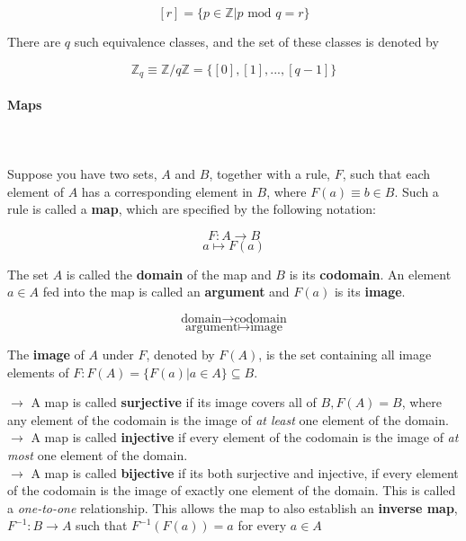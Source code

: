 \documentclass[11pt, oneside]{article}   	%
\begin{document}
\[ [r] = \{ p \in \mathbb{Z} | p \text{ mod } q = r\} \]

There are $q$ such equivalence classes, and the set of these classes is denoted by 

\[ \mathbb{Z}_q \equiv \mathbb{Z} / q\mathbb{Z} = \{[0], [1], ..., [q-1]\} \]

\paragraph{Maps} \mbox{} \\ \\ 

Suppose you have two sets, $A$ and $B$, together with a rule, $F$, such that each element of $A$ has a corresponding element in $B$, where $F(a) \equiv b \in B$. Such a rule is called a \textbf{map}, which are specified by the following notation: 

\[ F: A \rightarrow B \]
\[ a \mapsto F(a) \] 

The set $A$ is called the \textbf{domain} of the map and $B$ is its \textbf{codomain}. An element $a \in A$ fed into the map is called an \textbf{argument} and $F(a)$ is its \textbf{image}. 

\[ \text{domain} \rightarrow \text{codomain} \]
\[ \text{argument} \mapsto \text{image} \]

The \textbf{image} of $A$ under $F$, denoted by $F(A)$, is the set containing
all image elements of $F: F(A) = \{ F(a) | a \in A\} \subseteq B$. \\

\begin{tcolorbox}[colback = blue!5!white, colframe = blue!50!black, title
  = Different Tives] 
  
$\rightarrow$ A map is called \textbf{surjective} if its image covers all of $B, F(A) = B$, where any element of the codomain is the image of \textit{at least} one element of the domain.  \\
\indent $\rightarrow$ A map is called \textbf{injective} if every element of the codomain is the image of \textit{at most} one element of the domain. \\
\indent $\rightarrow$ A map is called \textbf{bijective} if its both surjective
and injective, if every element of the codomain is the image of exactly one
element of the domain. This is called a \textit{one-to-one} relationship. This allows the map to also establish an \textbf{inverse map}, $F^{-1}: B \rightarrow A$ such that $F^{-1}(F(a)) = a$ for every $a \in A$ \\ 

\end{tcolorbox}
\end{document}
